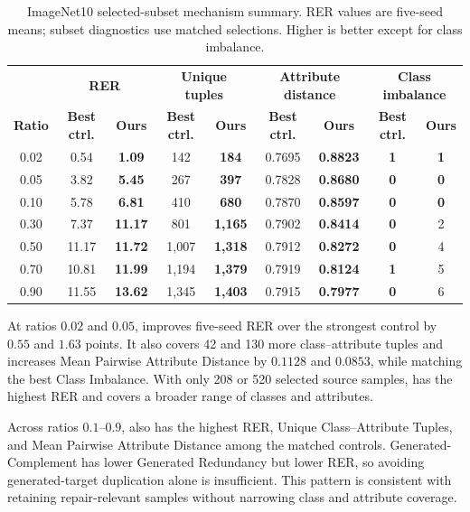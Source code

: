\begin{table}[t]
\centering
\caption{ImageNet10 selected-subset mechanism summary. RER values are five-seed means; subset diagnostics use matched selections. Higher is better except for class imbalance.}
\label{tab:selected-subset-mechanism}
\footnotesize
\setlength{\tabcolsep}{3pt}
\begin{tabular}{c cc cc cc cc}
\toprule
\rowcolor{sectiongray} & \multicolumn{2}{c}{\textbf{RER}} & \multicolumn{2}{c}{\textbf{Unique tuples}} & \multicolumn{2}{c}{\textbf{Attribute distance}} & \multicolumn{2}{c}{\textbf{Class imbalance}} \\
\rowcolor{sectiongray} \textbf{Ratio} & \textbf{Best ctrl.} & \textbf{Ours} & \textbf{Best ctrl.} & \textbf{Ours} & \textbf{Best ctrl.} & \textbf{Ours} & \textbf{Best ctrl.} & \textbf{Ours} \\
\midrule
0.02 & 0.54 & \textbf{1.09} & 142 & \textbf{184} & 0.7695 & \textbf{0.8823} & \textbf{1} & \textbf{1} \\
0.05 & 3.82 & \textbf{5.45} & 267 & \textbf{397} & 0.7828 & \textbf{0.8680} & \textbf{0} & \textbf{0} \\
0.10 & 5.78 & \textbf{6.81} & 410 & \textbf{680} & 0.7870 & \textbf{0.8597} & \textbf{0} & \textbf{0} \\
0.30 & 7.37 & \textbf{11.17} & 801 & \textbf{1,165} & 0.7902 & \textbf{0.8414} & \textbf{0} & 2 \\
0.50 & 11.17 & \textbf{11.72} & 1,007 & \textbf{1,318} & 0.7912 & \textbf{0.8272} & \textbf{0} & 4 \\
0.70 & 10.81 & \textbf{11.99} & 1,194 & \textbf{1,379} & 0.7919 & \textbf{0.8124} & \textbf{1} & 5 \\
0.90 & 11.55 & \textbf{13.62} & 1,345 & \textbf{1,403} & 0.7915 & \textbf{0.7977} & \textbf{0} & 6 \\
\bottomrule
\end{tabular}
\end{table}

At ratios $0.02$ and $0.05$, \model improves five-seed RER over the strongest control by $0.55$ and $1.63$ points. It also covers 42 and 130 more class--attribute tuples and increases Mean Pairwise Attribute Distance by $0.1128$ and $0.0853$, while matching the best Class Imbalance. With only 208 or 520 selected source samples, \model has the highest RER and covers a broader range of classes and attributes.

Across ratios $0.1$--$0.9$, \model also has the highest RER, Unique Class--Attribute Tuples, and Mean Pairwise Attribute Distance among the matched controls. Generated-Complement has lower Generated Redundancy but lower RER, so avoiding generated-target duplication alone is insufficient. This pattern is consistent with \model retaining repair-relevant samples without narrowing class and attribute coverage.

